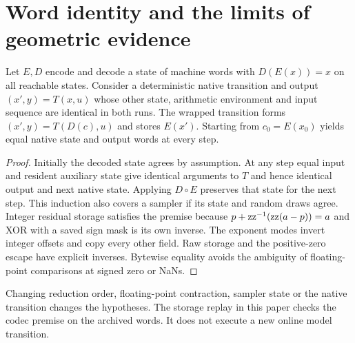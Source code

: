 \section{Word identity and the limits of geometric evidence}\label{app:words}
\begin{proposition}\label{th:transport}
Let $E,D$ encode and decode a state of machine words with $D(E(x))=x$ on all reachable states. Consider a deterministic native transition and output $(x',y)=T(x,u)$ whose other state, arithmetic environment and input sequence are identical in both runs. The wrapped transition forms $(x',y)=T(D(c),u)$ and stores $E(x')$. Starting from $c_0=E(x_0)$ yields equal native state and output words at every step.
\end{proposition}
\begin{proof}
Initially the decoded state agrees by assumption. At any step equal input and resident auxiliary state give identical arguments to $T$ and hence identical output and next native state. Applying $D\circ E$ preserves that state for the next step. This induction also covers a sampler if its state and random draws agree. Integer residual storage satisfies the premise because $p+\operatorname{zz}^{-1}(\operatorname{zz}(a-p))=a$ and XOR with a saved sign mask is its own inverse. The exponent modes invert integer offsets and copy every other field. Raw storage and the positive-zero escape have explicit inverses. Bytewise equality avoids the ambiguity of floating-point comparisons at signed zero or NaNs.
\end{proof}
Changing reduction order, floating-point contraction, sampler state or the native transition changes the hypotheses. The storage replay in this paper checks the codec premise on the archived words. It does not execute a new online model transition.

